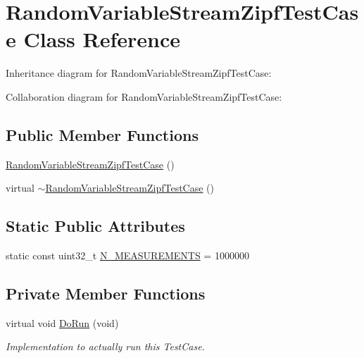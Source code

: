 \hypertarget{classRandomVariableStreamZipfTestCase}{}\section{Random\+Variable\+Stream\+Zipf\+Test\+Case Class Reference}
\label{classRandomVariableStreamZipfTestCase}


Inheritance diagram for Random\+Variable\+Stream\+Zipf\+Test\+Case\+:


Collaboration diagram for Random\+Variable\+Stream\+Zipf\+Test\+Case\+:
\subsection*{Public Member Functions}
\begin{DoxyCompactItemize}
\item 
\hyperlink{classRandomVariableStreamZipfTestCase_a7eb71495b5d05e7ecd1dfa72eddfa0b9}{Random\+Variable\+Stream\+Zipf\+Test\+Case} ()
\item 
virtual \hyperlink{classRandomVariableStreamZipfTestCase_a5ef80023473eacfcb8c54f71d0ac3235}{$\sim$\+Random\+Variable\+Stream\+Zipf\+Test\+Case} ()
\end{DoxyCompactItemize}
\subsection*{Static Public Attributes}
\begin{DoxyCompactItemize}
\item 
static const uint32\+\_\+t \hyperlink{classRandomVariableStreamZipfTestCase_a452b211d67b349e2e54898720f68901f}{N\+\_\+\+M\+E\+A\+S\+U\+R\+E\+M\+E\+N\+TS} = 1000000
\end{DoxyCompactItemize}
\subsection*{Private Member Functions}
\begin{DoxyCompactItemize}
\item 
virtual void \hyperlink{classRandomVariableStreamZipfTestCase_a85704e09590df03d979c956f514d4e2d}{Do\+Run} (void)
\begin{DoxyCompactList}\small\item\em Implementation to actually run this Test\+Case. \end{DoxyCompactList}\end{DoxyCompactItemize}
